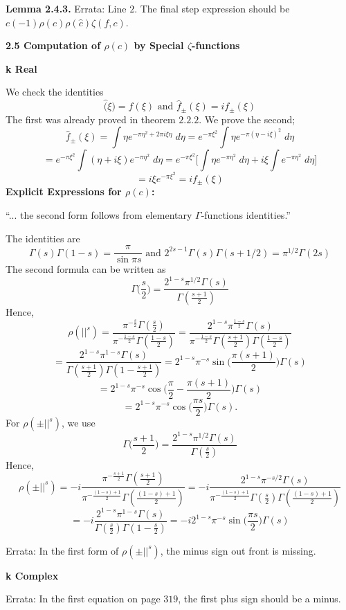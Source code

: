 \documentclass[12pt, letterpaper, twoside]
{article}
\begin{document}
\textbf{Lemma 2.4.3.} Errata: Line $2$. The final step expression should be
$c(-1)\rho(c)\rho(\hat{c})\zeta(f, c)$.

\textbf{2.5 Computation of $\rho(c)$ by Special $\zeta$-functions}

\begin{center} \textbf{k Real} \end{center}

We check the identities
\[\hat(\xi) = f(\xi) \text{ and } \hat{f}_{\pm}(\xi) = if_{\pm}(\xi)\] The first
was already proved in theorem $2.2.2.$ We prove the second;
\[\hat{f}_{\pm}(\xi) = \int \eta e^{-\pi\eta^2 + 2\pi i \xi \eta} \; d \eta =
e^{-\pi \xi^2} \int \eta e^{-\pi(\eta - i\xi)^2} \; d \eta\]
\[= e^{-\pi\xi^2} \int (\eta + i\xi)e^{-\pi\eta^2} \; d \eta = e^{-\pi\xi^2}
\bigg[\int \eta e^{-\pi\eta^2} \; d \eta + i \xi \int e^{-\pi\eta^2} \; d
\eta\bigg]\]
\[= i\xi e^{-\pi\xi^2} = i f_{\pm}(\xi)\]
\textbf{Explicit Expressions for $\rho(c)$:}

``... the second form follows from elementary $\Gamma$-functions identities.''

The identities are
\[\Gamma(s)\Gamma(1 - s) = \frac{\pi}{\sin \pi s} \text{ and } 2^{2s -
1}\Gamma(s)\Gamma(s + 1/2) = \pi^{1/2}\Gamma(2s)\] The second formula can be
written as
\[\Gamma\bigg(\frac{s}{2}\bigg) =
\frac{2^{1-s}\pi^{1/2}\Gamma(s)}{\Gamma(\frac{s + 1}{2})}\] Hence,
\[\rho(||^s) = \frac{\pi^{-\frac{s}{2}} \Gamma ( \frac{s}{2} )}{\pi^{-\frac{1 -
s}{2}}\Gamma( \frac{1 - s}{2} )} = \frac{2^{1 - s}\pi^{\frac{1 -
s}{2}}\Gamma(s)}{\pi^{-\frac{1 - s}{2}}\Gamma(\frac{s + 1}{2})\Gamma(\frac{1 -
s}{2})}\]
\[= \frac{2^{1 - s}\pi^{1 - s}\Gamma(s)}{\Gamma(\frac{s + 1}{2})\Gamma(1 -
\frac{s + 1}{2})} = 2^{1 - s}\pi^{-s}\sin \bigg(\frac{\pi(s +
1)}{2}\bigg)\Gamma(s)\]
\[= 2^{1 - s}\pi^{-s} \cos \bigg(\frac{\pi}{2}  - \frac{\pi(s +
1)}{2}\bigg)\Gamma(s)\]
\[= 2^{1 - s}\pi^{-s} \cos \bigg( \frac{\pi s}{2}\bigg) \Gamma(s).\] For
$\rho(\pm||^s)$, we use
\[\Gamma \bigg( \frac{s + 1}{2} \bigg) = \frac{2^{1 -
s}\pi^{1/2}\Gamma(s)}{\Gamma(\frac{s}{2})}\] Hence,
\[\rho(\pm||^s) = -i\frac{\pi^{-\frac{s + 1}{2}}\Gamma( \frac{s +
1}{2})}{\pi^{-\frac{(1 - s) + 1}{2}}\Gamma( \frac{(1 - s) + 1}{2})} = -i
\frac{2^{1 - s}\pi^{-s/2}\Gamma(s)}{\pi^{-\frac{(1 - s) +
1}{2}}\Gamma(\frac{s}{2})\Gamma(\frac{(1 - s) + 1}{2})}\]
\[= -i \frac{2^{1 - s}\pi^{1 -s}\Gamma(s)}{\Gamma(\frac{s}{2})\Gamma(1 -
\frac{s}{2})} = -i2^{1 - s}\pi^{- s}\sin \bigg( \frac{\pi s}{2}\bigg)\Gamma(s)\]

Errata: In the first form of $\rho(\pm ||^s)$, the minus sign out front is
missing.
\begin{center} \textbf{k Complex} \end{center} Errata: In the first equation on
page $319$, the first plus sign should be a minus.
\end{document}

